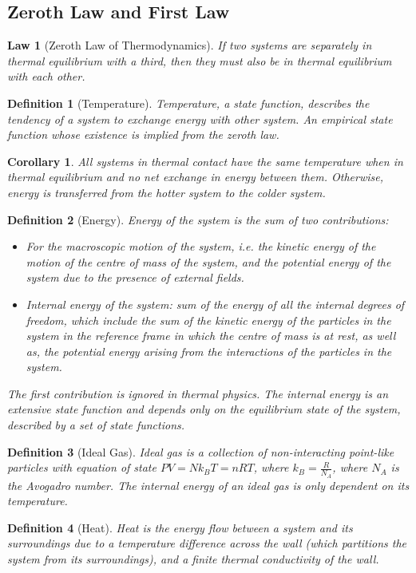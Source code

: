 \documentclass[a4paper]{article}
\theoremstyle{new}
\newtheorem{law}{Law}[section]
\newtheorem{defi}{Definition}[section]
\newtheorem{cor}{Corollary}[section]
\begin{document}
\subsection{Zeroth Law and First Law}
\begin{law}[Zeroth Law of Thermodynamics]
If two systems are separately in thermal equilibrium with a third, then they must also be in thermal equilibrium with each other.
\end{law}
\begin{defi}[Temperature]
Temperature, a state function, describes the tendency of a system to exchange energy with other system. An empirical state function whose existence is implied from the zeroth law.
\end{defi}
\begin{cor}
All systems in thermal contact have the same temperature when in thermal equilibrium and no net exchange in energy between them. Otherwise, energy is transferred from the hotter system to the colder system.
\end{cor}
\begin{defi}[Energy]
Energy of the system is the sum of two contributions:
\begin{itemize}
    \item For the macroscopic motion of the system, i.e. the kinetic energy of the motion of the centre of mass of the system, and the potential energy of the system due to the presence of external fields. 
    \item Internal energy of the system: sum of the energy of all the internal degrees of freedom, which include the sum of the kinetic energy of the particles in the system in the reference frame in which the centre of mass is at rest, as well as, the potential energy arising from the interactions of the particles in the system.
\end{itemize}
The first contribution is ignored in thermal physics. The internal energy is an extensive state function and depends only on the equilibrium state of the system, described by a set of state functions.
\end{defi}
\begin{defi}[Ideal Gas]
Ideal gas is a collection of non-interacting point-like particles with equation of state $PV=Nk_BT=nRT$, where $k_B=\frac{R}{N_A}$, where $N_A$ is the Avogadro number. The internal energy of an ideal gas is only dependent on its temperature.
\end{defi}
\begin{defi}[Heat]
Heat is the energy flow between a system and its surroundings due to a temperature difference across the wall (which partitions the system from its surroundings), and a finite thermal conductivity of the wall.
\end{defi}
\end{document}
